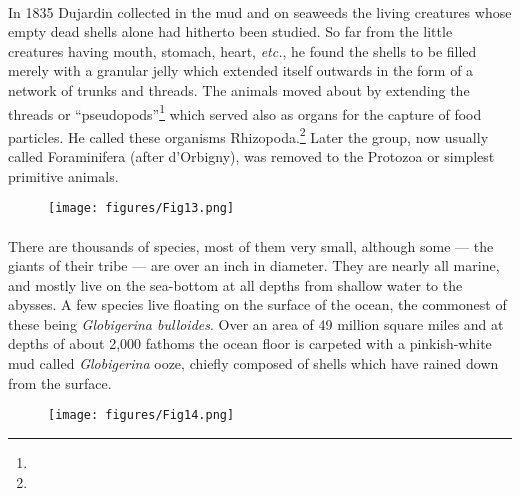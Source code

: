 \documentclass[a4paper, 12pt, oneside]{article}
\begin{document}
\paragraph{}
In 1835 Dujardin collected in the mud and on seaweeds the living creatures whose empty dead shells alone had hitherto been studied. So far from the little creatures having mouth, stomach, heart, \emph{etc.}, he found the shells to be filled merely with a granular jelly which extended itself outwards in the form of a network of trunks and threads. The animals moved about by extending the threads or ``pseudopods''\footnote{} which served also as organs for the capture of food particles. He called these organisms Rhizopoda.\footnote{} Later the group, now usually called Foraminifera (after d'Orbigny), was removed to the Protozoa or simplest primitive animals.
\begin{figure}[H]
\centering
\texttt{[image: figures/Fig13.png]}
\caption*{}
\end{figure}
\paragraph{}
There are thousands of species, most of them very small, although some --- the giants of their tribe --- are over an inch in diameter. They are nearly all marine, and mostly live on the sea-bottom at all depths from shallow water to the abysses. A few species live floating on the surface of the ocean, the commonest of these being \emph{Globigerina bulloides}. Over an area of 49 million square miles and at depths of about 2,000 fathoms the ocean floor is carpeted with a pinkish-white mud called \emph{Globigerina} ooze, chiefly composed of shells which have rained down from the surface.
\begin{figure}[H]
\centering
\texttt{[image: figures/Fig14.png]}
\caption*{}
\end{figure}
\end{document}
